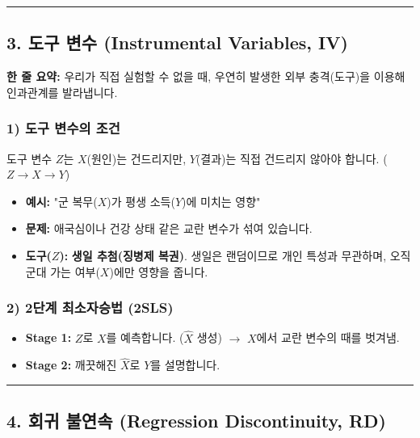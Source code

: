 \documentclass[11pt,a4paper]{book}
\theoremstyle{definition}
\begin{document}
\vspace{0.5cm}\hrule\vspace{0.5cm}

\subsection{3. 도구 변수 (Instrumental Variables, IV)}


\begin{conceptbox}[title={개념 3: 자연 실험(Natural Experiment) 이용하기}]
\textbf{한 줄 요약:} 우리가 직접 실험할 수 없을 때, 우연히 발생한 외부 충격(도구)을 이용해 인과관계를 발라냅니다.
\end{conceptbox}

\subsubsection*{1) 도구 변수의 조건}
도구 변수 $Z$는 $X$(원인)는 건드리지만, $Y$(결과)는 직접 건드리지 않아야 합니다. ($Z \to X \to Y$)
\begin{itemize}
    \item \textbf{예시:} "군 복무($X$)가 평생 소득($Y$)에 미치는 영향"
    \item \textbf{문제:} 애국심이나 건강 상태 같은 교란 변수가 섞여 있습니다.
    \item \textbf{도구($Z$):} \textbf{생일 추첨(징병제 복권)}. 생일은 랜덤이므로 개인 특성과 무관하며, 오직 군대 가는 여부($X$)에만 영향을 줍니다.
\end{itemize}

\subsubsection*{2) 2단계 최소자승법 (2SLS)}
\begin{itemize}
    \item \textbf{Stage 1:} $Z$로 $X$를 예측합니다. ($\hat{X}$ 생성) $\rightarrow$ $X$에서 교란 변수의 때를 벗겨냄.
    \item \textbf{Stage 2:} 깨끗해진 $\hat{X}$로 $Y$를 설명합니다.
\end{itemize}

\vspace{0.5cm}\hrule\vspace{0.5cm}

\subsection{4. 회귀 불연속 (Regression Discontinuity, RD)}
\end{document}
